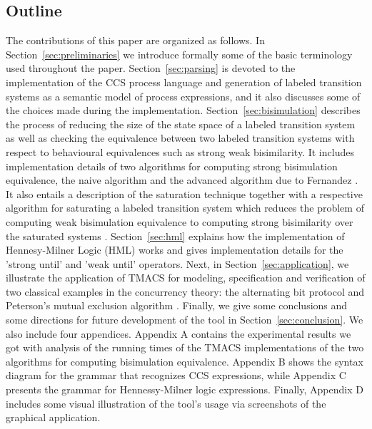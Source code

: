 \subsection{Outline} 
The contributions of this paper are organized as follows. In Section~\ref{sec:preliminaries} we introduce formally some of the basic terminology used throughout the paper. Section~\ref{sec:parsing} is devoted to the implementation of the CCS process language and generation of labeled transition systems as a semantic model of process expressions, and it also discusses some of the choices made during the implementation. Section~\ref{sec:bisimulation} describes the process of reducing the size of the state space of a labeled transition system as well as checking the equivalence between two labeled transition systems with respect to behavioural equivalences such as strong weak bisimilarity. It includes implementation details of two algorithms for computing strong bisimulation equivalence, the naive algorithm \cite{ReactiveSystems} and the advanced algorithm due to Fernandez \cite{Fernandez}. It also entails a description of the saturation technique together with a respective algorithm for saturating a labeled transition system which reduces the problem of computing weak bisimulation equivalence to computing strong bisimilarity over the saturated systems \cite{ReactiveSystems}. Section~\ref{sec:hml} explains how the implementation of Hennesy-Milner Logic (HML) works and gives implementation details for the 'strong until' and 'weak until' operators. Next, in Section~\ref{sec:application}, we illustrate the application of TMACS for modeling, specification and verification of two classical examples in the concurrency theory: the alternating bit protocol \cite{ABP1}\cite{ABP2} and Peterson's mutual exclusion algorithm \cite{Peterson}. Finally, we give some conclusions and some directions for future development of the tool in Section~\ref{sec:conclusion}. We also include four appendices. Appendix A contains the experimental results we got with analysis of the running times of the TMACS implementations of the two algorithms for computing bisimulation equivalence. Appendix B shows the syntax diagram for the grammar that recognizes CCS expressions, while Appendix C presents the grammar for Hennessy-Milner logic expressions. Finally, Appendix D includes some visual illustration of the tool's usage via screenshots of the graphical application.
